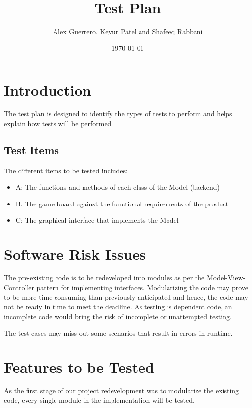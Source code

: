 \documentclass[12pt]{article}
\begin{document}
\title{Test Plan} 
\author{Alex Guerrero, Keyur Patel and Shafeeq Rabbani}
\date{\today}

\maketitle

\tableofcontents
\newpage
%
%

\section{Introduction}
The test plan is designed to identify the types of tests to perform and helps explain how tests will be performed.

\subsection{Test Items}
The different items to be tested includes:

\begin{itemize}
\item A: The functions and methods of each class of the Model (backend)
\item B: The game board against the functional requirements of the product
\item C: The graphical interface that implements the Model 
\end{itemize}

\section{Software Risk Issues}

The pre-existing code is to be redeveloped into modules as per the Model-View-Controller pattern for implementing interfaces. Modularizing the code may prove to be more time consuming than previously anticipated and hence, the code may not be ready in time to meet the deadline. As testing is dependent code, an incomplete code would bring the risk of incomplete or unattempted testing.

The test cases may miss out some scenarios that result in errors in runtime.


\section{Features to be Tested}

As the first stage of our project redevelopment was to modularize the existing code, every single module in the implementation will be tested.
\end{document}
